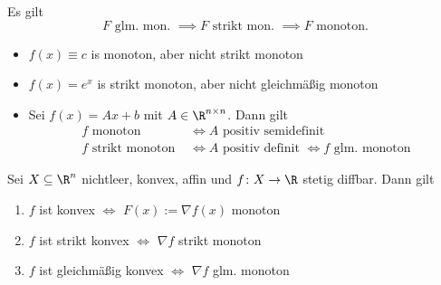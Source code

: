 Es gilt
\[
F \text{ glm. mon. } \implies F \text{ strikt mon. } \implies F \text{ monoton}
.\] 

\begin{beispiel}
\label{thm:beispielmonotonefunktionen2}
	\begin{itemize}
		\item $f(x) \equiv c$ is monoton, aber nicht strikt monoton
		\item $f(x) = e^{x}$ is strikt monoton, aber nicht gleichmäßig monoton
		\item Sei $f(x) = Ax + b$ mit $ A \in \R^{n \times n}$. Dann gilt
			\begin{align*}
				f \text{ monoton } &\iff A \text{ positiv semidefinit} \\
				f \text{ strikt monoton } &\iff A \text{ positiv definit } \iff f \text{ glm. monoton}
			\end{align*}
			
	\end{itemize}
\end{beispiel}

\begin{satz}
\label{thm:monotonefunktionenäquivalenzen}
	Sei $X \subseteq \R^{n}$ nichtleer, konvex, affin und $f \colon X \rightarrow \R $ stetig diffbar. Dann gilt
	\begin{enumerate}[label=(\alph{enumi})]
		\item $f$ ist konvex $\iff$ $F(x):= \nabla f(x)$ monoton
		\item $f$ ist strikt konvex $\iff$ $\nabla f$ strikt monoton
		\item $f$ ist gleichmäßig konvex $\iff$ $\nabla f$ glm. monoton
	\end{enumerate}
\end{satz}

